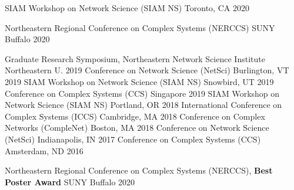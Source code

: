 \begin{cvhonors}
    \cvhonor
        {} %
        {SIAM Workshop on Network Science (SIAM NS)} %
        {Toronto, CA} %
        {2020} %

    \cvhonor
        {} %
        {Northeastern Regional Conference on Complex Systems (NERCCS)} %
        {SUNY Buffalo} %
        {2020} %
        
    \cvhonor
        {} %
        {Graduate Research Symposium, Northeastern Network Science Institute} %
        {Northeastern U.} %
        {2019} %
    \cvhonor
        {} %
        {Conference on Network Science (NetSci)} %
        {Burlington, VT} %
        {2019} %
    \cvhonor
        {} %
        {SIAM Workshop on Network Science (SIAM NS)} %
        {Snowbird, UT} %
        {2019} %
    \cvhonor
        {} %
        {Conference on Complex Systems (CCS)} %
        {Singapore} %
        {2019} %
    \cvhonor
        {} %
        {SIAM Workshop on Network Science (SIAM NS)} %
        {Portland, OR} %
        {2018} %
    \cvhonor
        {} %
        {International Conference on Complex Systems (ICCS)} %
        {Cambridge, MA} %
        {2018} %
    \cvhonor
        {} %
        {Conference on Complex Networks (CompleNet)} %
        {Boston, MA} %
        {2018} %
    \cvhonor
        {} %
        {Conference on Network Science (NetSci)} %
        {Indianapolis, IN} %
        {2017} %
    \cvhonor
        {} %
        {Conference on Complex Systems (CCS)} %
        {Amsterdam, ND} %
        {2016} %
\end{cvhonors}


\begin{cvhonors}
    \cvhonor
        {} %
        {Northeastern Regional Conference on Complex Systems (NERCCS), \textbf{Best Poster Award}} %
        {SUNY Buffalo} %
        {2020} %
\end{cvhonors}